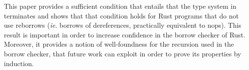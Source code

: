 This paper provides a sufficient condition that entails that the type system
in~\cite{Pearce21} terminates and shows that that condition holds for Rust programs that do not use
reborrows (\textit{ie.} borrows of dereferences, practically equivalent to nops).
This result is important in order to increase confidence in the borrow checker of Rust.
Moreover, it provides a notion of well-foundness for the recursion used in the borrow checker,
that future work can exploit in order to prove its properties by induction.
